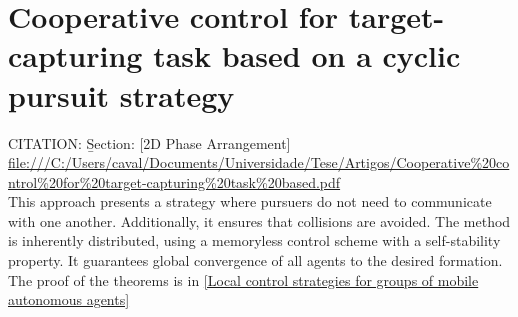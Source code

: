 \section{Cooperative control for target-capturing task based on a cyclic pursuit strategy}\label{Cooperative control for target-capturing task based on a cyclic pursuit strategy}

CITATION: \cite{KIM20071426} \b{Section: [2D Phase Arrangement]}\\
\url{file:///C:/Users/caval/Documents/Universidade/Tese/Artigos/Cooperative%20control%20for%20target-capturing%20task%20based.pdf}\\

This approach presents a strategy where pursuers do not need to communicate with one another. Additionally, it ensures that collisions are avoided. The method is inherently distributed, using a memoryless control scheme with a self-stability property. It guarantees global convergence of all agents to the desired formation.
The proof of the theorems is in \ref{Local control strategies for groups of mobile autonomous agents}